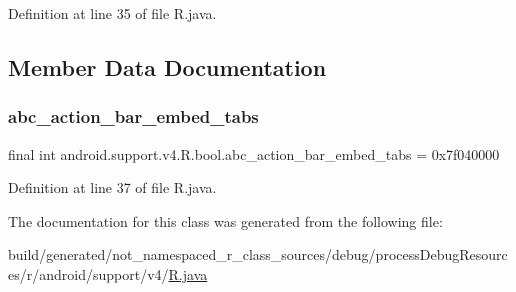 Definition at line 35 of file R.\+java.


\begin{DoxyCode}{0}

\end{DoxyCode}


\subsection{Member Data Documentation}
\mbox{\label{classandroid_1_1support_1_1v4_1_1_r_1_1bool_ae48329695247e01d9540cb1c14ff19b0}} 
\subsubsection{\texorpdfstring{abc\_action\_bar\_embed\_tabs}{abc\_action\_bar\_embed\_tabs}}
{\footnotesize\ttfamily final int android.\+support.\+v4.\+R.\+bool.\+abc\+\_\+action\+\_\+bar\+\_\+embed\+\_\+tabs = 0x7f040000\hspace{0.3cm}{\ttfamily [static]}}



Definition at line 37 of file R.\+java.



The documentation for this class was generated from the following file\+:\begin{DoxyCompactItemize}
\item 
build/generated/not\+\_\+namespaced\+\_\+r\+\_\+class\+\_\+sources/debug/process\+Debug\+Resources/r/android/support/v4/\mbox{\hyperlink{android_2support_2v4_2_r_8java}{R.\+java}}\end{DoxyCompactItemize}
